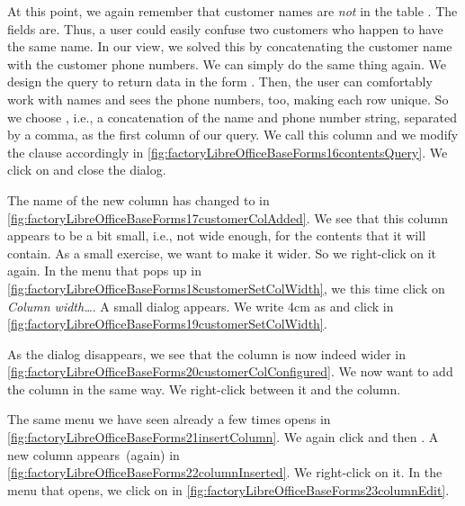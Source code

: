 At this point, we again remember that customer names are \emph{not}  in the table .
The  fields are.
Thus, a user could easily confuse two customers who happen to have the same name.
In our  view, we solved this by concatenating the customer name with the customer phone numbers.
We can simply do the same thing again.
We design the query to return data in the form .
Then, the user can comfortably work with names and sees the phone numbers, too, making each row unique.
So we choose \sqlIdx{\textbar\textbar}, i.e., a concatenation of the name and phone number string, separated by a comma, as the first column of our query.
We call this column  and we modify the  clause accordingly in \cref{fig:factoryLibreOfficeBaseForms16contentsQuery}.
We click on  and close the dialog.

The name of the new column has changed to  in \cref{fig:factoryLibreOfficeBaseForms17customerColAdded}.
We see that this column appears to be a bit small, i.e., not wide enough, for the contents that it will contain.
As a small exercise, we want to make it wider.
So we right-click on it again.
In the menu that pops up in \cref{fig:factoryLibreOfficeBaseForms18customerSetColWidth}, we this time click on \emph{Column width\dots}.
A small dialog appears.
We write 4cm as  and click  in \cref{fig:factoryLibreOfficeBaseForms19customerSetColWidth}.

As the dialog disappears, we see that the column is now indeed wider in \cref{fig:factoryLibreOfficeBaseForms20customerColConfigured}.
We now want to add the  column in the same way.
We right-click between it and the  column.

The same menu we have seen already a few times opens in \cref{fig:factoryLibreOfficeBaseForms21insertColumn}.
We again click  and then .
A new  column appears~(again) in \cref{fig:factoryLibreOfficeBaseForms22columnInserted}.
We right-click on it.
In the menu that opens, we click on  in \cref{fig:factoryLibreOfficeBaseForms23columnEdit}.

